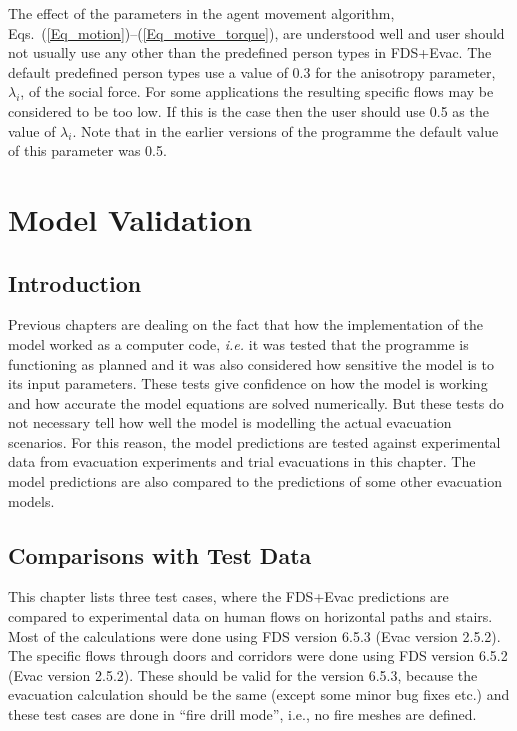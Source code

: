 \documentclass[12pt,a4paper,final,twoside]{stylevk}
\begin{document}
The effect of the parameters in the agent movement algorithm,
Eqs.~(\ref{Eq_motion})--(\ref{Eq_motive_torque}), are understood well and
user should not usually use any other than the predefined person types
in FDS+Evac.  The default predefined person types use a value of 0.3
for the anisotropy parameter, $\lambda_i$, of the social force.  For
some applications the resulting specific flows may be considered to be
too low.  If this is the case then the user should use 0.5 as the
value of $\lambda_i$.  Note that in the earlier versions of the
programme the default value of this parameter was 0.5.

\clearpage

\newpage


\chapter{Model Validation}\label{Sec_ModelValid}


\section{Introduction}

\noindent Previous chapters are dealing on the fact that how the
implementation of the model worked as a computer code, \emph{i.e.} it
was tested that the programme is functioning as planned and it was
also considered how sensitive the model is to its input parameters.
These tests give confidence on how the model is working and how
accurate the model equations are solved numerically.  But these tests
do not necessary tell how well the model is modelling the actual
evacuation scenarios.  For this reason, the model predictions are
tested against experimental data from evacuation experiments and trial
evacuations in this chapter.  The model predictions are also compared
to the predictions of some other evacuation models.



\section{Comparisons with Test Data}

\noindent This chapter lists three test cases, where the FDS+Evac
predictions are compared to experimental data on human flows on
horizontal paths and stairs.  Most of the calculations were done using
FDS version 6.5.3 (Evac version 2.5.2).  The specific flows through
doors and corridors were done using FDS version 6.5.2 (Evac version
2.5.2). These should be valid for the version 6.5.3, because the
evacuation calculation should be the same (except some minor bug fixes
etc.) and these test cases are done in ``fire drill mode'', i.e., no
fire meshes are defined.
\end{document}
